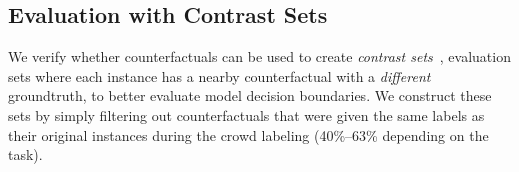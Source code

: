 







\subsection{Evaluation with Contrast Sets}
\label{subsec:contrast_set}

We verify whether \sysname counterfactuals can be used to create \emph{contrast sets}~\cite{gardner2020contrast}, \ie evaluation sets where each instance has a nearby counterfactual with a \emph{different} groundtruth, to better evaluate model decision boundaries.
We construct these sets by simply filtering out counterfactuals that were given the same labels as their original instances during the crowd labeling (40\%--63\% depending on the task).

